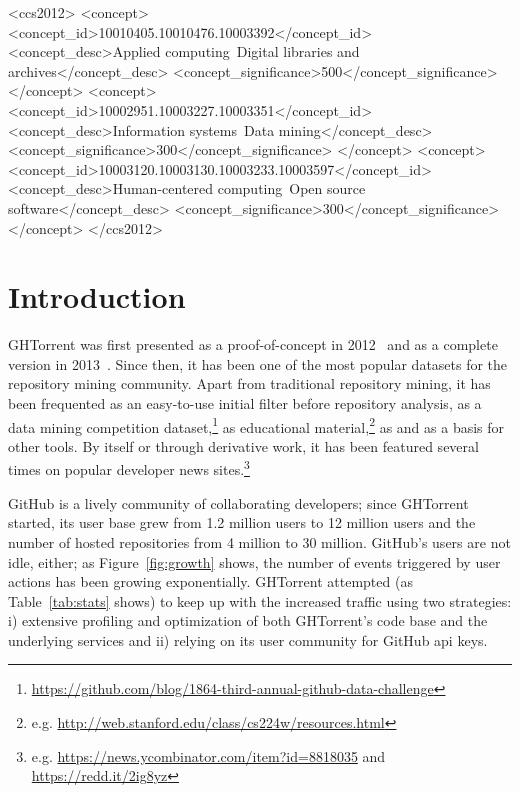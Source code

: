 \documentclass{sig-alternate}
\begin{document}
%
%
\begin{CCSXML}
<ccs2012>
<concept>
<concept_id>10010405.10010476.10003392</concept_id>
<concept_desc>Applied computing~Digital libraries and archives</concept_desc>
<concept_significance>500</concept_significance>
</concept>
<concept>
<concept_id>10002951.10003227.10003351</concept_id>
<concept_desc>Information systems~Data mining</concept_desc>
<concept_significance>300</concept_significance>
</concept>
<concept>
<concept_id>10003120.10003130.10003233.10003597</concept_id>
<concept_desc>Human-centered computing~Open source software</concept_desc>
<concept_significance>300</concept_significance>
</concept>
</ccs2012>
\end{CCSXML}


%
%
\printccsdesc


\section{Introduction}

GHTorrent was first presented as a proof-of-concept in 2012~\cite{GS12} and as a
complete version in 2013~\cite{Gousi13}. Since then, it has been one of the most
popular datasets for the repository mining community. Apart from traditional
repository mining, it has been frequented as an easy-to-use initial filter
before repository analysis, as a data mining competition
dataset,\footnote{\url{https://github.com/blog/1864-third-annual-github-data-challenge}}
as educational
material,\footnote{e.g. \url{http://web.stanford.edu/class/cs224w/resources.html}}
as and as a basis for other tools.  By itself or through
derivative work, it has been featured several times on popular developer news
sites.\footnote{e.g. \url{https://news.ycombinator.com/item?id=8818035} and\\
\url{https://redd.it/2ig8yz}}

GitHub is a lively community of collaborating developers; since GHTorrent
started, its user base grew from 1.2 million users to 12 million users and the
number of hosted repositories from 4 million to 30 million. GitHub's users are not idle,
either; as Figure~\ref{fig:growth} shows, the number of events triggered by user
actions has been growing exponentially. GHTorrent attempted (as
Table~\ref{tab:stats} shows) to keep up with the increased traffic using two
strategies: i) extensive profiling and optimization of both GHTorrent's code
base and the underlying services and ii) relying on its user community for
GitHub {\sc api} keys.
\end{document}
